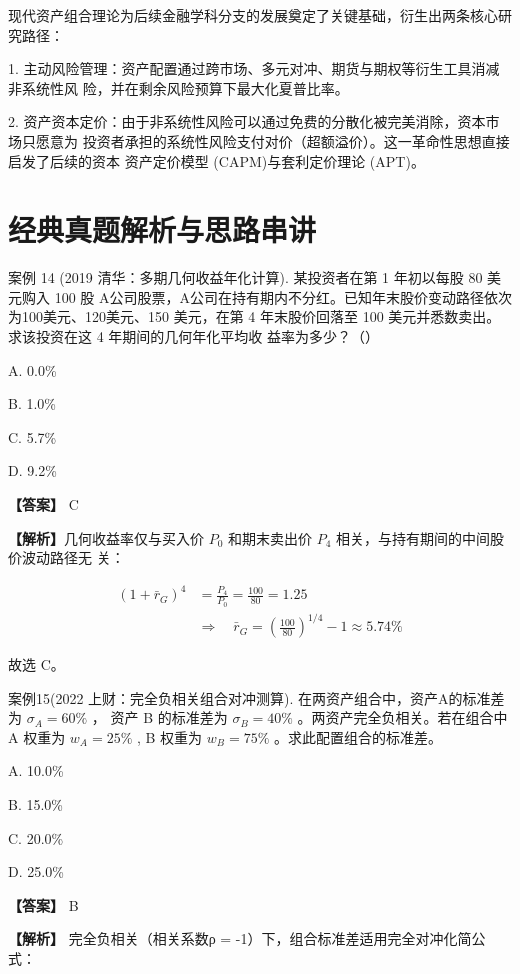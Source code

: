 \documentclass[lang=cn,10pt,color=blue]{elegantbook}
\begin{document}
现代资产组合理论为后续金融学科分支的发展奠定了关键基础，衍生出两条核心研究路径： 

1. 主动风险管理：资产配置通过跨市场、多元对冲、期货与期权等衍生工具消减非系统性风 险，并在剩余风险预算下最大化夏普比率。 

2. 资产资本定价：由于非系统性风险可以通过免费的分散化被完美消除，资本市场只愿意为 投资者承担的系统性风险支付对价（超额溢价）。这一革命性思想直接启发了后续的资本 资产定价模型 (CAPM)与套利定价理论 (APT)。 

\section{经典真题解析与思路串讲}

案例 14 (2019 清华：多期几何收益年化计算). 某投资者在第 1 年初以每股 80 美元购入 100 股 A公司股票，A公司在持有期内不分红。已知年末股价变动路径依次为100美元、120美元、150 美元，在第 4 年末股价回落至 100 美元并悉数卖出。求该投资在这 4 年期间的几何年化平均收 益率为多少？（） 

A. 0.0\% 

B. 1.0\% 

C. 5.7\% 

D. 9.2\% 

\textbf{\color{UnivColor} 【答案】} C 

\textbf{\color{UnivColor} 【解析】}几何收益率仅与买入价 $P _ { 0 }$ 和期末卖出价 $P _ { 4 }$ 相关，与持有期间的中间股价波动路径无 关： 

$$
\begin{aligned}
  (1 + \bar {r} _ {G}) ^ {4} &= \frac {P _ {4}}{P _ {0}} = \frac {1 0 0}{8 0} = 1. 2 5 \\[1.2ex]
  &\Rightarrow \quad \boxed {\bar {r} _ {G} = \left(\frac {100}{80}\right) ^ {1 / 4} - 1 \approx 5.74 \%}
\end{aligned}
$$

故选 C。 

案例15(2022 上财：完全负相关组合对冲测算). 在两资产组合中，资产A的标准差为 $\sigma _ { A } = 6 0 \%$ ， 资产 B 的标准差为 $\sigma _ { B } = 4 0 \%$ 。两资产完全负相关。若在组合中 A 权重为 $w _ { A } = 2 5 \%$ , B 权重为 $w _ { B } = 7 5 \%$ 。求此配置组合的标准差。 

A. 10.0\% 

B. 15.0\% 

C. 20.0\% 

D. 25.0\% 

\textbf{\color{UnivColor} 【答案】} B 

\textbf{\color{UnivColor} 【解析】} 完全负相关（相关系数ρ = -1）下，组合标准差适用完全对冲化简公式： 
\end{document}
